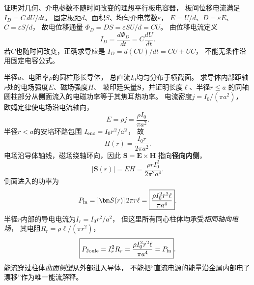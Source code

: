 \problemtext 证明对几何、介电参数不随时间改变的理想平行板电容器，
板间位移电流满足$I_D=C\,dU/dt$。
\workings
固定板距$d$、面积$S$、均匀介电常数$\varepsilon$，
$E=U/d$、$D=\varepsilon E$、$C=\varepsilon S/d$，
故电位移通量
$\Phi_D=DS=\varepsilon SU/d=CU$。
由位移电流定义
\[
\boxed{I_D=\frac{d\Phi_D}{dt}
=C\frac{dU}{dt}}.
\]
\crosscheck 若$C$也随时间改变，正确求导应是
$I_D=d(CU)/dt=C\dot U+U\dot C$，
不能无条件沿用固定电容公式。

\problemtext 半径$a$、电阻率$\rho$的圆柱形长导体，
总直流$I_0$均匀分布于横截面。
求导体内部距轴$r$处的电场强度$E$、磁场强度$H$、
坡印廷矢量$\bm S$，并证明长度$\ell$、半径$r\le a$
的同轴圆柱部分从侧面流入的电磁功率等于其焦耳热功率。
\workings
电流密度$j=I_0/(\pi a^2)$，
欧姆定律使电场沿电流轴向，
\[
\boxed{E=\rho j=\frac{\rho I_0}{\pi a^2}}.
\]
半径$r<a$的安培环路包围
$I_{\rm enc}=I_0r^2/a^2$，
故
\[
\boxed{H(r)=\frac{I_0r}{2\pi a^2}}.
\]
电场沿导体轴线，磁场绕轴环向，因此
$\bm S=\bm E\times\bm H$
指向\textbf{径向内侧}，
\[
\boxed{|\bm S(r)|=EH
=\frac{\rho r I_0^2}{2\pi^2a^4}}.
\]
侧面进入的功率为
\[
P_{\rm in}=|\bm S(r)|\,2\pi r\ell
=\boxed{\frac{\rho I_0^2r^2\ell}{\pi a^4}}.
\]
半径$r$内部的导电电流为$I_r=I_0r^2/a^2$，
但这里所有同心柱体均承受\emph{相同轴向电场}，
其电阻$R_r=\rho\ell/(\pi r^2)$，
\[
\boxed{P_{\rm Joule}=I_r^2R_r
=\frac{\rho I_0^2r^2\ell}{\pi a^4}=P_{\rm in}}.
\]
\crosscheck 能流穿过柱体\emph{曲面侧壁}从外部进入导体，
不能把“直流电源的能量沿金属内部电子漂移”作为唯一能流解释。
